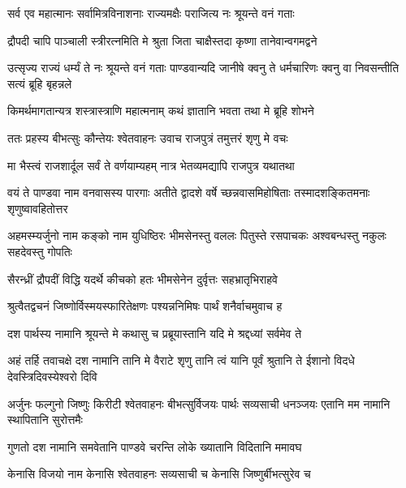 \twolineshloka
{सर्व एव महात्मानः सर्वामित्रविनाशनाः}
{राज्यमक्षैः पराजित्य नः श्रूयन्ते वनं गताः}


\twolineshloka
{द्रौपदी चापि पाञ्चाली स्त्रीरत्नमिति मे श्रुता}
{जिता चाक्षैस्तदा कृष्णा तानेवान्वगमद्वने}


\onelineshloka
{उत्सृज्य राज्यं धर्म्यं ते नः श्रूयन्ते वनं गताः}
\twolineshloka
{पाण्डवान्यदि जानीषे क्वनु ते धर्मचारिणः}
{क्वनु वा निवसन्तीति सत्यं ब्रूहि बृहन्नले}


\twolineshloka
{किमर्थमागतान्यत्र शस्त्रास्त्राणि महात्मनाम्}
{कथं ज्ञातानि भवता तथा मे ब्रूहि शोभने}



\twolineshloka
{ततः प्रहस्य बीभत्सुः कौन्तेयः श्वेतवाहनः}
{उवाच राजपुत्रं तमुत्तरं शृणु मे वचः}


\twolineshloka
{मा भैस्त्वं राजशार्दूल सर्वं ते वर्णयाम्यहम्}
{नात्र भेतव्यमद्यापि राजपुत्र यथातथा}


\threelineshloka
{वयं ते पाण्डवा नाम वनवासस्य पारगाः}
{अतीते द्वादशे वर्षे च्छन्नवासमिहोषिताः}
{तस्मादशङ्कितमनाः शृणुष्वावहितोत्तर}


\threelineshloka
{अहमस्म्यर्जुनो नाम कङ्को नाम युधिष्ठिरः}
{भीमसेनस्तु वललः पितुस्ते रसपाचकः}
{अश्वबन्धस्तु नकुलः सहदेवस्तु गोपतिः}


\twolineshloka
{सैरन्ध्रीं द्रौपदीं विद्धि यदर्थे कीचको हतः}
{भीमसेनेन दुर्वृत्तः सहभ्रातृभिराहवे}


\twolineshloka
{श्रुत्वैतद्वचनं जिष्णोर्विस्मयस्फारितेक्षणः}
{पश्यन्ननिमिषः पार्थं शनैर्वाचमुवाच ह}




\twolineshloka
{दश पार्थस्य नामानि श्रूयन्ते मे कथासु च}
{प्रब्रूयास्तानि यदि मे श्रद्दध्यां सर्वमेव ते}




\threelineshloka
{अहं तर्हि तवाचक्षे दश नामानि तानि मे}
{वैराटे शृणु तानि त्वं यानि पूर्वं श्रुतानि ते}
{ईशानो विदधे देवस्त्रिदिवस्येश्वरो दिवि}


\threelineshloka
{अर्जुनः फल्गुनो जिष्णुः किरीटी श्वेतवाहनः}
{बीभत्सुर्विजयः पार्थः सव्यसाची धनञ्जयः}
{एतानि मम नामानि स्थापितानि सुरोत्तमैः}




\twolineshloka
{गुणतो दश नामानि समवेतानि पाण्डवे}
{चरन्ति लोके ख्यातानि विदितानि ममावघ}


\twolineshloka
{केनासि विजयो नाम केनासि श्वेतवाहनः}
{सव्यसाची च केनासि जिष्णुर्बीभत्सुरेव च}


